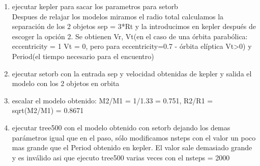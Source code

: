 \documentclass[12pt]{book}
\begin{document}
\begin{enumerate}
\item ejecutar kepler para sacar los parametros para setorb\\
Despues de relajar los modelos miramos el radio total calculamos  la separación de los 2 objetos  sep = 3*Rt y la introducimos en kepler después de escoger la opción 2.
Se obtienen Vr, Vt(en el caso de una órbita  parabólica: eccentricity = 1 Vt = 0, pero para eccentricity=0.7 - órbita elíptica Vt>0) y Period(el tiempo necesario para el encuentro)

\item ejecutar setorb con la entrada sep y velocidad obtenidas de kepler y salida el modelo con los 2 objetos en orbita
\item escalar el modelo obtenido: M2/M1 = 1/1.33 = 0.751, R2/R1 = sqrt(M2/M1) = 0.8671
\item ejecutar tree500 con el modelo obtenido con setorb dejando los demas parámetros igual que en el paso, sólo modificamos nsteps con el valor un poco mas grande que el Period obtenido en kepler. El valor sale demasiado grande y es inválido asi que ejecuto tree500 varias veces con el nsteps = 2000


\end{enumerate}
\end{document}
